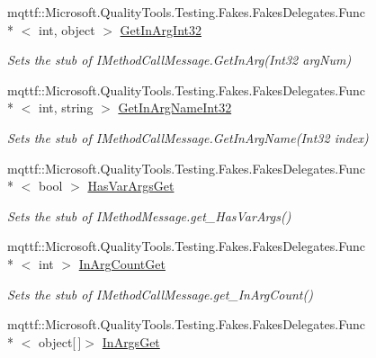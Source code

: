 \begin{DoxyCompactItemize}
mqttf\-::\-Microsoft.\-Quality\-Tools.\-Testing.\-Fakes.\-Fakes\-Delegates.\-Func\\*
$<$ int, object $>$ \hyperlink{class_system_1_1_runtime_1_1_remoting_1_1_messaging_1_1_fakes_1_1_stub_i_method_call_message_a0f3e3cf49836818497a1b1d896f98bfd}{Get\-In\-Arg\-Int32}
\begin{DoxyCompactList}\small\item\em Sets the stub of I\-Method\-Call\-Message.\-Get\-In\-Arg(\-Int32 arg\-Num)\end{DoxyCompactList}\item 
mqttf\-::\-Microsoft.\-Quality\-Tools.\-Testing.\-Fakes.\-Fakes\-Delegates.\-Func\\*
$<$ int, string $>$ \hyperlink{class_system_1_1_runtime_1_1_remoting_1_1_messaging_1_1_fakes_1_1_stub_i_method_call_message_aa507dbef73dbf5cabab883056706f55f}{Get\-In\-Arg\-Name\-Int32}
\begin{DoxyCompactList}\small\item\em Sets the stub of I\-Method\-Call\-Message.\-Get\-In\-Arg\-Name(\-Int32 index)\end{DoxyCompactList}\item 
mqttf\-::\-Microsoft.\-Quality\-Tools.\-Testing.\-Fakes.\-Fakes\-Delegates.\-Func\\*
$<$ bool $>$ \hyperlink{class_system_1_1_runtime_1_1_remoting_1_1_messaging_1_1_fakes_1_1_stub_i_method_call_message_ac7db8390e971140e55e2f3119801ba80}{Has\-Var\-Args\-Get}
\begin{DoxyCompactList}\small\item\em Sets the stub of I\-Method\-Message.\-get\-\_\-\-Has\-Var\-Args()\end{DoxyCompactList}\item 
mqttf\-::\-Microsoft.\-Quality\-Tools.\-Testing.\-Fakes.\-Fakes\-Delegates.\-Func\\*
$<$ int $>$ \hyperlink{class_system_1_1_runtime_1_1_remoting_1_1_messaging_1_1_fakes_1_1_stub_i_method_call_message_a603a9a486ba7d12a5df56ba1e8dcf4a6}{In\-Arg\-Count\-Get}
\begin{DoxyCompactList}\small\item\em Sets the stub of I\-Method\-Call\-Message.\-get\-\_\-\-In\-Arg\-Count()\end{DoxyCompactList}\item 
mqttf\-::\-Microsoft.\-Quality\-Tools.\-Testing.\-Fakes.\-Fakes\-Delegates.\-Func\\*
$<$ object\mbox{[}$\,$\mbox{]}$>$ \hyperlink{class_system_1_1_runtime_1_1_remoting_1_1_messaging_1_1_fakes_1_1_stub_i_method_call_message_a0ee1acea9f2a89242ca424d588c57f06}{In\-Args\-Get}

\end{DoxyCompactItemize}
